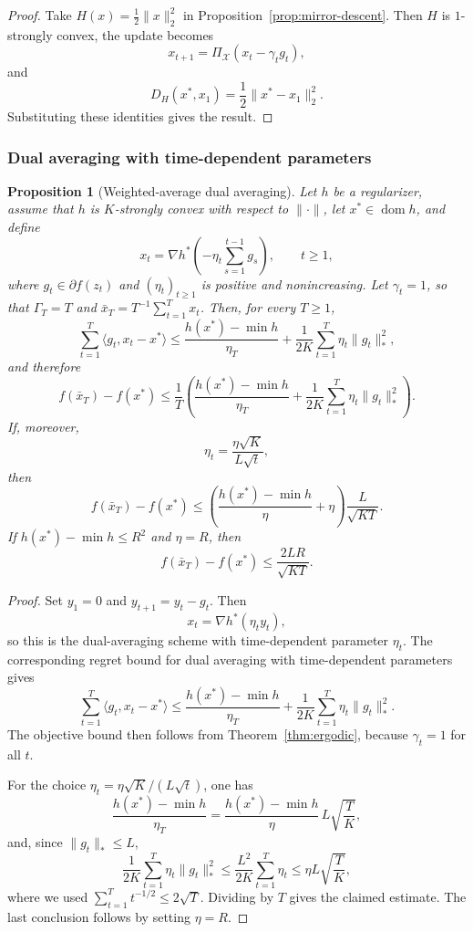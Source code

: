 \documentclass[11pt]{article}
\newtheorem{proposition}[theorem]{Proposition}
\theoremstyle{definition}
\theoremstyle{remark}
\newcommand{\X}{\mathcal{X}}
\newcommand{\inner}[2]{\langle #1, #2 \rangle}
\newcommand{\norm}[1]{\lVert #1 \rVert}
\newcommand{\normdual}[1]{\lVert #1 \rVert_*}
\DeclareMathOperator{\dom}{dom}
\begin{document}
\begin{proof}
Take $H(x)=\tfrac12 \norm{x}_2^2$ in Proposition~\ref{prop:mirror-descent}. Then $H$ is $1$-strongly convex, the update becomes
\[
    x_{t+1} = \Pi_{\X}(x_t-\gamma_t g_t),
\]
and
\[
    D_H(x^*,x_1) = \frac12 \norm{x^*-x_1}_2^2.
\]
Substituting these identities gives the result.
\end{proof}

\subsubsection{Dual averaging with time-dependent parameters}

\begin{proposition}[Weighted-average dual averaging]
\label{prop:dual-averaging}
Let $h$ be a regularizer, assume that $h$ is $K$-strongly convex with respect to $\norm{\cdot}$, let $x^* \in \dom h$, and define
\[
    x_t = \nabla h^*\!\left(-\eta_t \sum_{s=1}^{t-1} g_s\right),
    \qquad
    t\ge 1,
\]
where $g_t \in \partial f(z_t)$ and $(\eta_t)_{t\ge 1}$ is positive and nonincreasing. Let $\gamma_t=1$, so that $\Gamma_T=T$ and $\bar{x}_T = T^{-1}\sum_{t=1}^T x_t$. Then, for every $T\ge 1$,
\[
    \sum_{t=1}^T \inner{g_t}{x_t-x^*}
    \le
    \frac{h(x^*)-\min h}{\eta_T}
    +
    \frac{1}{2K}\sum_{t=1}^T \eta_t \normdual{g_t}^2,
\]
and therefore
\[
    f(\bar{x}_T)-f(x^*)
    \le
    \frac{1}{T}
    \left(
        \frac{h(x^*)-\min h}{\eta_T}
        +
        \frac{1}{2K}\sum_{t=1}^T \eta_t \normdual{g_t}^2
    \right).
\]
If, moreover,
\[
    \eta_t = \frac{\eta\sqrt{K}}{L\sqrt{t}},
\]
then
\[
    f(\bar{x}_T)-f(x^*)
    \le
    \left(
        \frac{h(x^*)-\min h}{\eta}
        +
        \eta
    \right)
    \frac{L}{\sqrt{KT}}.
\]
If $h(x^*)-\min h \le R^2$ and $\eta=R$, then
\[
    f(\bar{x}_T)-f(x^*) \le \frac{2LR}{\sqrt{KT}}.
\]
\end{proposition}

\begin{proof}
Set $y_1=0$ and $y_{t+1}=y_t-g_t$. Then
\[
    x_t = \nabla h^*(\eta_t y_t),
\]
so this is the dual-averaging scheme with time-dependent parameter $\eta_t$. The corresponding regret bound for dual averaging with time-dependent parameters gives
\[
    \sum_{t=1}^T \inner{g_t}{x_t-x^*}
    \le
    \frac{h(x^*)-\min h}{\eta_T}
    +
    \frac{1}{2K}\sum_{t=1}^T \eta_t \normdual{g_t}^2.
\]
The objective bound then follows from Theorem~\ref{thm:ergodic}, because $\gamma_t=1$ for all $t$.

For the choice $\eta_t = \eta\sqrt{K}/(L\sqrt{t})$, one has
\[
    \frac{h(x^*)-\min h}{\eta_T}
    =
    \frac{h(x^*)-\min h}{\eta}\,L\sqrt{\frac{T}{K}},
\]
and, since $\normdual{g_t}\le L$,
\[
    \frac{1}{2K}\sum_{t=1}^T \eta_t \normdual{g_t}^2
    \le
    \frac{L^2}{2K}\sum_{t=1}^T \eta_t
    \le
    \eta L\sqrt{\frac{T}{K}},
\]
where we used $\sum_{t=1}^T t^{-1/2} \le 2\sqrt{T}$. Dividing by $T$ gives the claimed estimate. The last conclusion follows by setting $\eta=R$.
\end{proof}
\end{document}
